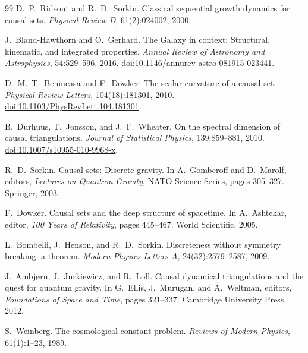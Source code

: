 \documentclass[11pt,a4paper]{article}
\theoremstyle{plain}
\theoremstyle{definition}
\theoremstyle{remark}
\begin{document}
\begin{thebibliography}{99}
D.~P.~Rideout and R.~D.~Sorkin.
\newblock Classical sequential growth dynamics for causal sets.
\newblock \textit{Physical Review D}, 61(2):024002, 2000.

J.~Bland-Hawthorn and O.~Gerhard.
\newblock The Galaxy in context: Structural, kinematic, and integrated
  properties.
\newblock \emph{Annual Review of Astronomy and Astrophysics}, 54:529--596, 2016.
\newblock \href{https://doi.org/10.1146/annurev-astro-081915-023441}{doi:10.1146/annurev-astro-081915-023441}.

D.~M.~T.~Benincasa and F.~Dowker.
\newblock The scalar curvature of a causal set.
\newblock \emph{Physical Review Letters}, 104(18):181301, 2010.
\newblock \href{https://doi.org/10.1103/PhysRevLett.104.181301}{doi:10.1103/PhysRevLett.104.181301}.

B.~Durhuus, T.~Jonsson, and J.~F.~Wheater.
\newblock On the spectral dimension of causal triangulations.
\newblock \emph{Journal of Statistical Physics}, 139:859--881, 2010.
\newblock \href{https://doi.org/10.1007/s10955-010-9968-x}{doi:10.1007/s10955-010-9968-x}.

R.~D.~Sorkin.
\newblock Causal sets: Discrete gravity.
\newblock In A.~Gomberoff and D.~Marolf, editors, \textit{Lectures on Quantum
  Gravity}, NATO Science Series, pages 305--327. Springer, 2003.

F.~Dowker.
\newblock Causal sets and the deep structure of spacetime.
\newblock In A.~Ashtekar, editor, \textit{100 Years of Relativity}, pages
  445--467. World Scientific, 2005.

L.~Bombelli, J.~Henson, and R.~D.~Sorkin.
\newblock Discreteness without symmetry breaking: a theorem.
\newblock \textit{Modern Physics Letters A}, 24(32):2579--2587, 2009.

J.~Ambjørn, J.~Jurkiewicz, and R.~Loll.
\newblock Causal dynamical triangulations and the quest for quantum gravity.
\newblock In G.~Ellis, J.~Murugan, and A.~Weltman, editors,
  \textit{Foundations of Space and Time}, pages 321--337.
  Cambridge University Press, 2012.

S.~Weinberg.
\newblock The cosmological constant problem.
\newblock \textit{Reviews of Modern Physics}, 61(1):1--23, 1989.


\end{thebibliography}
\end{document}
